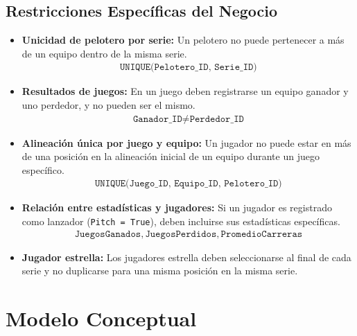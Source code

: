 \documentclass{report}
\begin{document}
    \subsection*{Restricciones Específicas del Negocio}
    \begin{itemize}
        \item \textbf{Unicidad de pelotero por serie:} Un pelotero no puede pertenecer a más de un equipo dentro de 
        la misma serie.
        \begin{align*}
            \texttt{UNIQUE(Pelotero\_ID, Serie\_ID)}
        \end{align*}

        \item \textbf{Resultados de juegos:} En un juego deben registrarse un equipo ganador y uno perdedor, y no 
        pueden ser el mismo.
        \begin{align*}
            \texttt{Ganador\_ID} \neq \texttt{Perdedor\_ID}
        \end{align*}

        \item \textbf{Alineación única por juego y equipo:} Un jugador no puede estar en más de una posición en la 
        alineación inicial de un equipo durante un juego específico.
        \begin{align*}
            \texttt{UNIQUE(Juego\_ID, Equipo\_ID, Pelotero\_ID)}
        \end{align*}

        \item \textbf{Relación entre estadísticas y jugadores:} Si un jugador es registrado como lanzador 
        (\texttt{Pitch = True}), deben incluirse sus estadísticas específicas.
        \begin{align*}
            \texttt{JuegosGanados}, \texttt{JuegosPerdidos}, \texttt{PromedioCarreras}
        \end{align*}

        \item \textbf{Jugador estrella:} Los jugadores estrella deben seleccionarse al final de cada serie y no 
        duplicarse para una misma posición en la misma serie.
    \end{itemize}


    \newpage

    \section*{Modelo Conceptual}
\end{document}
